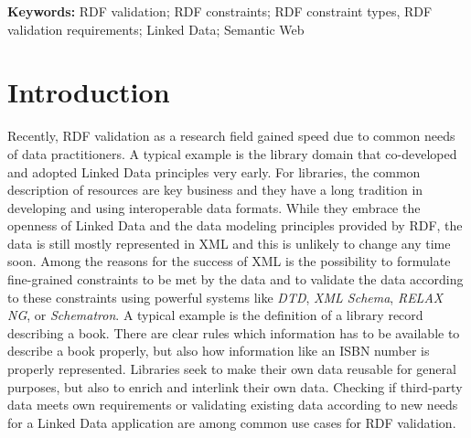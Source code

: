 \documentclass[a4paper,fontsize=11pt]{scrartcl}
\begin{document}
\hspace{-1.4em}
\textbf{Keywords:}
RDF validation; RDF constraints; RDF constraint types, RDF validation requirements; Linked Data; Semantic Web

\section{Introduction}

Recently, RDF validation as a research field gained speed due to common needs of data practitioners. A typical example is the library domain that co-developed and adopted Linked Data principles very early. For libraries, the common description of resources are key business and they have a long tradition in developing and using interoperable data formats. While they embrace the openness of Linked Data and the data modeling principles provided by RDF, the data is still mostly represented in XML and this is unlikely to change any time soon. 
Among the reasons for the success of XML is the possibility to formulate fine-grained constraints to be met by the data and to validate the data according to these constraints using powerful systems like \emph{DTD}, \emph{XML Schema}, \emph{RELAX NG}, or \emph{Schematron}.
A typical example is the definition of a library record describing a book. There are clear rules which information has to be available to describe a book properly, but also how information like an ISBN number is properly represented. Libraries seek to make their own data reusable for general purposes, but also to enrich and interlink their own data. Checking if third-party data meets own requirements or validating existing data according to new needs for a Linked Data application are among common use cases for RDF validation.
\end{document}
